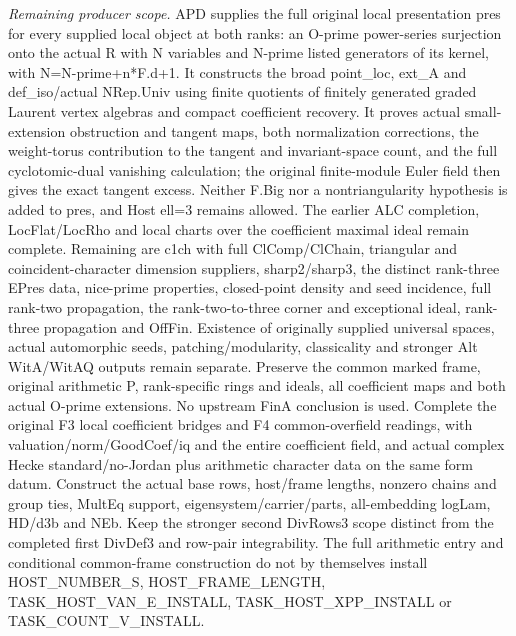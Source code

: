 \documentclass[11pt,a4paper]{article}
\numberwithin{equation}{section}
\theoremstyle{remark}\newtheorem{remark}[theorem]{Remark}
\begin{document}
\emph{Remaining producer scope.} APD supplies the full original local presentation pres for every supplied local object at both ranks: an O-prime power-series surjection onto the actual R with N variables and N-prime listed generators of its kernel, with N=N-prime+n*F.d+1. It constructs the broad point\_\allowbreak loc, ext\_\allowbreak A and def\_\allowbreak iso/actual NRep.Univ using finite quotients of finitely generated graded Laurent vertex algebras and compact coefficient recovery. It proves actual small-extension obstruction and tangent maps, both normalization corrections, the weight-torus contribution to the tangent and invariant-space count, and the full cyclotomic-dual vanishing calculation; the original finite-module Euler field then gives the exact tangent excess. Neither F.Big nor a nontriangularity hypothesis is added to pres, and Host ell=3 remains allowed. The earlier ALC completion, LocFlat/LocRho and local charts over the coefficient maximal ideal remain complete. Remaining are c1ch with full ClComp/ClChain, triangular and coincident-character dimension suppliers, sharp2/sharp3, the distinct rank-three EPres data, nice-prime properties, closed-point density and seed incidence, full rank-two propagation, the rank-two-to-three corner and exceptional ideal, rank-three propagation and OffFin. Existence of originally supplied universal spaces, actual automorphic seeds, patching/modularity, classicality and stronger Alt WitA/WitAQ outputs remain separate. Preserve the common marked frame, original arithmetic P, rank-specific rings and ideals, all coefficient maps and both actual O-prime extensions. No upstream FinA conclusion is used. Complete the original F3 local coefficient bridges and F4 common-overfield readings, with valuation/norm/GoodCoef/iq and the entire coefficient field, and actual complex Hecke standard/no-Jordan plus arithmetic character data on the same form datum. Construct the actual base rows, host/frame lengths, nonzero chains and group ties, MultEq support, eigensystem/carrier/parts, all-embedding logLam, HD/d3b and NEb. Keep the stronger second DivRows3 scope distinct from the completed first DivDef3 and row-pair integrability. The full arithmetic entry and conditional common-frame construction do not by themselves install HOST\_\allowbreak NUMBER\_\allowbreak S, HOST\_\allowbreak FRAME\_\allowbreak LENGTH, TASK\_\allowbreak HOST\_\allowbreak VAN\_\allowbreak E\_\allowbreak INSTALL, TASK\_\allowbreak HOST\_\allowbreak XPP\_\allowbreak INSTALL or TASK\_\allowbreak COUNT\_\allowbreak V\_\allowbreak INSTALL.
\end{document}
